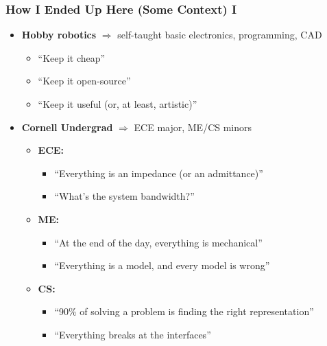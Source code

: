 \documentclass[aspectratio=169,handout]{beamer}
\begin{document}
	
		\begin{frame}
			\frametitle{How I Ended Up Here (Some Context) I}
			\vspace{-0.5em}
			\begin{itemize}
				\item \textbf{Hobby robotics} $\Rightarrow$ self-taught basic electronics, programming, CAD\pause
					\begin{itemize}
						\item ``Keep it cheap''
						\item ``Keep it open-source''
						\item ``Keep it useful (or, at least, artistic)''
					\end{itemize}\pause
				\vspace{0.5em}
				\item \textbf{Cornell Undergrad} $\Rightarrow$ ECE major, ME/CS minors\pause
					\begin{itemize}
						\item \textbf{ECE:}
							\begin{itemize}
								\item ``Everything is an impedance (or an admittance)''
								\item ``What's the system bandwidth?''
							\end{itemize}
						\item \textbf{ME:}\pause
							\begin{itemize}
								\item ``At the end of the day, everything is mechanical''
								\item ``Everything is a model, and every model is wrong''
							\end{itemize}\pause
						\item \textbf{CS:} 
						\begin{itemize}
							\item ``90\% of solving a problem is finding the right representation''
							\item ``Everything breaks at the interfaces''
						\end{itemize}
					\end{itemize}
			\end{itemize}
		\end{frame}
	
\end{document}
